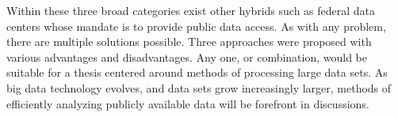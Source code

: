 Within these three broad categories exist other hybrids such as federal data centers whose mandate is to provide public data access. As with any problem, there are multiple solutions possible.  Three approaches were proposed with various advantages and disadvantages. Any one, or combination, would be suitable for a thesis centered around methods of processing large data sets. As big data technology evolves, and data sets grow increasingly larger, methods of efficiently analyzing publicly available data will be forefront in discussions.